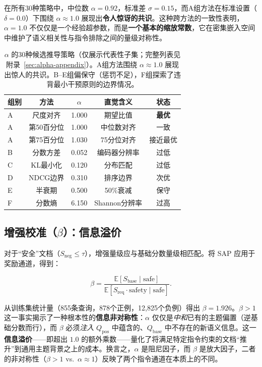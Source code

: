 \documentclass[12pt,a4paper]{article}
\newcommand{\qbase}{Q_{\text{base}}}
\newcommand{\qpos}{Q_{\text{pos}}}
\begin{document}
在所有30种策略中，中位数 $\alpha = 0.92$，标准差 $\sigma = 0.15$，而A组方法在标准设置（$\delta = 0.0$）下围绕 $\alpha \approx 1.0$ 展现出\textbf{令人惊讶的共识}。这种跨方法的一致性表明，$\alpha = 1.0$ 不仅仅是一个经验超参数，而是\textbf{一个基本的缩放常数}，它在密集嵌入空间中维护了语义相关性与指令排除之间的量级对称性。

\begin{table}[h]
\centering
\scriptsize
\begin{tabular}{lcccc}
\toprule
\textbf{组别} & \textbf{方法} & $\alpha$ & \textbf{直觉含义} & \textbf{状态} \\
\midrule
A & 尺度对齐 & 1.000 & 期望比值 & \textbf{最优} \\
A & 第50百分位 & 1.000 & 中位数对齐 & 一致 \\
A & 第75百分位 & 1.030 & 75分位对齐 & 接近最优 \\
B & 分数方差 & 0.052 & 编码器分辨率 & 过低 \\
C & KL最小化 & 0.120 & 分布匹配 & 过低 \\
D & NDCG边界 & 0.310 & 排序边界 & 次优 \\
E & 半衰期 & 0.500 & 50\%衰减 & 保守 \\
F & 分数熵 & 6.150 & Shannon分辨率 & 过高 \\
\bottomrule
\end{tabular}
\caption{$\alpha$ 的30种候选推导策略（仅展示代表性子集；完整列表见附录~\ref{sec:alpha-appendix}）。A组方法围绕 $\alpha \approx 1.0$ 展现出惊人的共识。B--E组偏保守（惩罚不足），F组探索了违背最小干预原则的边界情况。}
\label{tab:alpha-derivation}
\end{table}

\subsection{增强校准（$\beta$）：信息溢价}

对于“安全”文档（$S_{\text{neg}} \leq \tau$），增强量级应与基础分数量级相匹配。将 SAP 应用于奖励通道，得到：

\begin{equation}
  \beta = \frac{\mathbb{E}[S_{\text{base}} \mid \text{safe}]}
    {\mathbb{E}[S_{\text{req}} \cdot \text{safety} \mid \text{safe}]}.
  \label{eq:beta}
\end{equation}

从训练集统计量（855条查询，878个正例，12,825个负例）得出 $\beta = 1.926$。$\beta > 1$ 这一事实揭示了一种根本性的\textbf{信息非对称性}：$\alpha$ 仅仅是\textit{中和}已有的主题偏置（逆基础分数而行），而 $\beta$ 必须\textit{注入} $\qpos$ 中蕴含的、$\qbase$ 中不存在的新语义信息。这一\textbf{信息溢价}——即超出 $1.0$ 的额外乘数——量化了将满足特定指令约束的文档“推升”到通用主题背景之上的成本。换言之，$\alpha$ 是阻尼因子，而 $\beta$ 是放大因子，二者的非对称性（$\beta > 1$ vs.\ $\alpha \approx 1$）反映了两个指令通道在本质上的不同。
\end{document}
